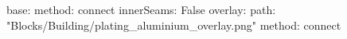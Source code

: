 base:
  method: connect
  innerSeams: False
overlay:
  path: "Blocks/Building/plating_aluminium_overlay.png"
  method: connect
